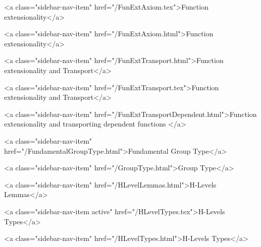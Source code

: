       
    
      
        
          <a class="sidebar-nav-item" href="/FunExtAxiom.tex">Function extensionality</a>
        
      
    
      
        
          <a class="sidebar-nav-item" href="/FunExtAxiom.html">Function extensionality</a>
        
      
    
      
        
          <a class="sidebar-nav-item" href="/FunExtTransport.html">Function extensionality and Transport</a>
        
      
    
      
        
          <a class="sidebar-nav-item" href="/FunExtTransport.tex">Function extensionality and Transport</a>
        
      
    
      
        
          <a class="sidebar-nav-item" href="/FunExtTransportDependent.html">Function extensionality and transporting dependent functions </a>
        
      
    
      
        
          <a class="sidebar-nav-item" href="/FundamentalGroupType.html">Fundamental Group Type</a>
        
      
    
      
        
          <a class="sidebar-nav-item" href="/GroupType.html">Group Type</a>
        
      
    
      
        
          <a class="sidebar-nav-item" href="/HLevelLemmas.html">H-Levels Lemmas</a>
        
      
    
      
        
          <a class="sidebar-nav-item active" href="/HLevelTypes.tex">H-Levels Types</a>
        
      
    
      
        
          <a class="sidebar-nav-item" href="/HLevelTypes.html">H-Levels Types</a>
        
      
    
      
        
